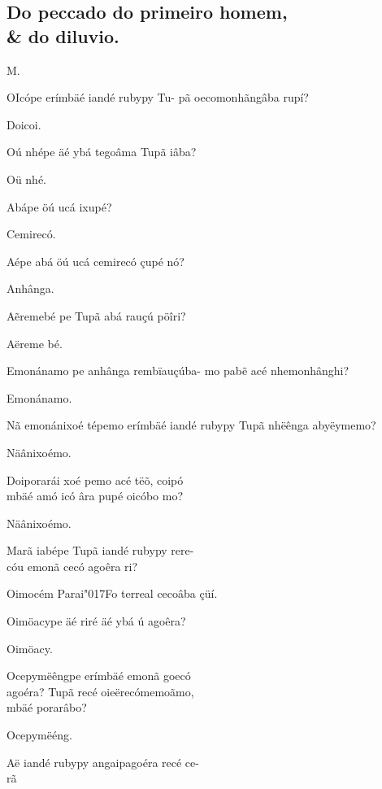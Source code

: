 \documentclass[openany,titlepage,12pt]{book}
\renewcommand{\chaptermark}[1]{\markboth{#1}{}}
\renewcommand{\sectionmark}[1]{\gdef\rightmark{#1}}
\newcommand{\lgS}{\char"017F}
\newcommand{\comecalista}[5]{
    \hspace*{-11.7pt}
    \begin{minipage}[t]{0.08\linewidth}
        \flushright #1\\#2
    \end{minipage}
    \hspace{0pt}
    \begin{minipage}[t]{0.94\linewidth}
        \lettrine
        [findent =2pt, nindent=0pt,  lines=2]
        {#3}{#4}#5
    \end{minipage}
    \vspace*{-3pt}
}
\begin{document}
\subsection{Do peccado do primeiro homem,\\
 \& do diluvio.}

\chaptermark{Dialogo IV.}
\sectionmark{Do peccado de Adaõ.}
\vspace*{2pt}

\comecalista{M.}{}{O}{I}
    {cópe erímbäé iandé rubypy Tu-
    pã oecomonhãngâba rupí?}

\begin{altereven}
    \item Doicoi.
    \item Oú nhépe äé ybá tegoâma Tupã iâba?
    \item Oü nhé.
    \item Abápe öú ucá ixupé?
    \item Cemirecó.
    \item Aépe abá öú ucá cemirecó çupé nó?
    \item Anhânga.
    \item Aẽremebé pe Tupã abá rauçú pöîri?
    \item Aëreme bé.
    \item Emonánamo pe anhânga rembïauçúba-
    mo pabẽ acé nhemonhânghi?
    \item Emonánamo.
    \item Nã emonánixoé tépemo erímbäé iandé
    rubypy Tupã nhëênga abyëymemo?
    \item Näânixoémo.
    \item Doiporarái xoé pemo acé tëõ, coipó\\
    mbäé amó icó âra pupé oicóbo mo?
    \item Näânixoémo.
    \item Marã iabépe Tupã iandé rubypy rere-\\
    cóu emonã cecó agoêra ri?
    \item Oimocém Parai\lgS o terreal cecoâba çüí.
    \item Oimöacype äé riré äé ybá ú agoêra? 
    \item Oimöacy.
    \item Ocepymëêngpe erímbäé emonã goecó\\
    agoéra? Tupã recé oieërecómemoãmo,\\
    mbäé porarâbo?
    \item Ocepymëéng.
    \item Aë iandé rubypy angaipagoéra recé ce-\\rã

\end{altereven}
\end{document}
